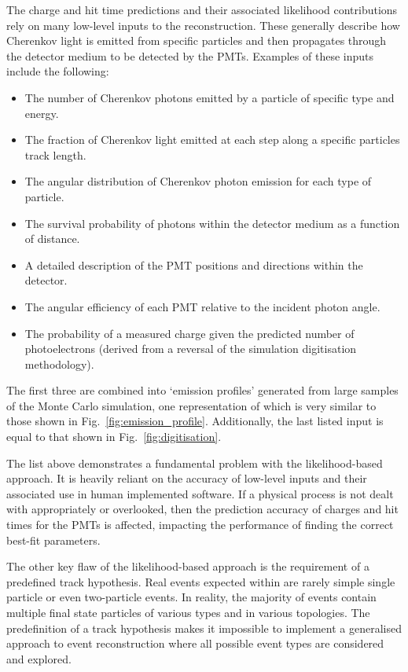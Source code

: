 The charge and hit time predictions and their associated likelihood contributions rely on many
low-level inputs to the reconstruction. These generally describe how Cherenkov light is emitted
from specific particles and then propagates through the detector medium to be detected by the
PMTs. Examples of these inputs include the following:
\begin{itemize}
    \item The number of Cherenkov photons emitted by a particle of specific type and energy.
    \item The fraction of Cherenkov light emitted at each step along a specific particles track
          length.
    \item The angular distribution of Cherenkov photon emission for each type of particle.
    \item The survival probability of photons within the detector medium as a function of
          distance.
    \item A detailed description of the PMT positions and directions within the detector.
    \item The angular efficiency of each PMT relative to the incident photon angle.
    \item The probability of a measured charge given the predicted number of photoelectrons
          (derived from a reversal of the simulation digitisation methodology).
\end{itemize}
The first three are combined into `emission profiles' generated from large samples of the Monte
Carlo simulation, one representation of which is very similar to those shown in
Fig.~\ref{fig:emission_profile}. Additionally, the last listed input is equal to that shown in
Fig.~\ref{fig:digitisation}.

The list above demonstrates a fundamental problem with the likelihood-based approach. It is
heavily reliant on the accuracy of low-level inputs and their associated use in human implemented
software. If a physical process is not dealt with appropriately or overlooked, then the prediction
accuracy of charges and hit times for the PMTs is affected, impacting the performance of finding
the correct best-fit parameters.

The other key flaw of the likelihood-based approach is the requirement of a predefined track
hypothesis. Real events expected within \chips are rarely simple single particle or even
two-particle events. In reality, the majority of events contain multiple final state particles of
various types and in various topologies. The predefinition of a track hypothesis makes it
impossible to implement a generalised approach to event reconstruction where all possible event
types are considered and explored.

